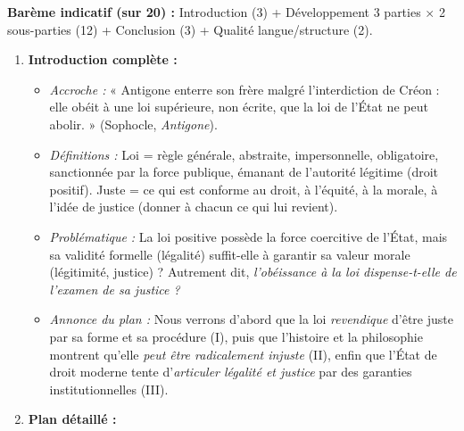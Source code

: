\documentclass[11pt]{article}
\newcommand{\cle}[1]{{\popxbold\color{popdark}#1}}
\begin{document}
\begin{corrige}
\textbf{Barème indicatif (sur 20) :} Introduction (3) + Développement 3 parties $\times$ 2 sous-parties (12) + Conclusion (3) + Qualité langue/structure (2).

\begin{enumerate}
\item \textbf{Introduction complète :}
      \begin{itemize}
      \item \emph{Accroche :} « Antigone enterre son frère malgré l'interdiction de Créon : elle obéit à une loi supérieure, non écrite, que la loi de l'État ne peut abolir. » (Sophocle, \emph{Antigone}).
      \item \emph{Définitions :} \cle{Loi} = règle générale, abstraite, impersonnelle, obligatoire, sanctionnée par la force publique, émanant de l'autorité légitime (droit positif). \cle{Juste} = ce qui est conforme au droit, à l'équité, à la morale, à l'idée de justice (donner à chacun ce qui lui revient).
      \item \emph{Problématique :} La loi positive possède la force coercitive de l'État, mais sa validité formelle (légalité) suffit-elle à garantir sa valeur morale (légitimité, justice) ? Autrement dit, \emph{l'obéissance à la loi dispense-t-elle de l'examen de sa justice ?}
      \item \emph{Annonce du plan :} Nous verrons d'abord que la loi \emph{revendique} d'être juste par sa forme et sa procédure (I), puis que l'histoire et la philosophie montrent qu'elle \emph{peut être radicalement injuste} (II), enfin que l'État de droit moderne tente d'\emph{articuler légalité et justice} par des garanties institutionnelles (III).
      \end{itemize}

\item \textbf{Plan détaillé :}


\end{enumerate}
\end{corrige}
\end{document}

